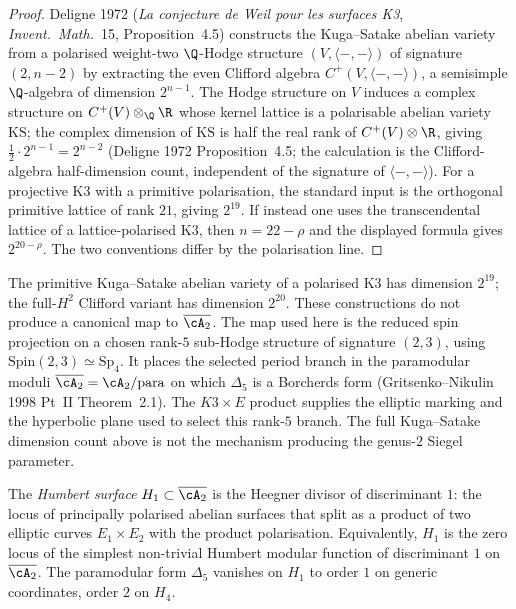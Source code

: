 \begin{proof}
Deligne 1972 (\emph{La conjecture de Weil pour les surfaces K3},
\emph{Invent.\ Math.}~15, Proposition~4.5) constructs the
Kuga--Satake abelian variety from a polarised weight-two
$\Q$-Hodge structure $(V, \langle -, - \rangle)$ of signature
$(2, n - 2)$ by extracting the even Clifford algebra
$C^+(V, \langle -, - \rangle)$, a semisimple $\Q$-algebra of
dimension $2^{n - 1}$. The Hodge structure on $V$ induces a
complex structure on $C^+(V) \otimes_\Q \R$ whose kernel lattice
is a polarisable abelian variety $\mathrm{KS}$; the complex
dimension of $\mathrm{KS}$ is half the real rank of $C^+(V) \otimes \R$,
giving $\tfrac12 \cdot 2^{n - 1} = 2^{n - 2}$ (Deligne 1972
Proposition~4.5; the calculation is the Clifford-algebra half-dimension
count, independent of the signature of $\langle -, - \rangle$).
For a projective K3 with a primitive polarisation, the standard input
is the orthogonal primitive lattice of rank $21$, giving
$2^{19}$. If instead one uses the transcendental lattice of a
lattice-polarised K3, then $n=22-\rho$ and the displayed formula gives
$2^{20-\rho}$. The two conventions differ by the polarisation line.
\end{proof}

\begin{remark}
\label{gluing:rem:ks-map-A2}
The primitive Kuga--Satake abelian variety of a polarised K3 has
dimension $2^{19}$; the full-$H^2$ Clifford variant has dimension
$2^{20}$. These constructions do not produce a canonical map to
\(\overline{\cA_2}\). The map used here is the reduced spin projection
on a chosen rank-\(5\) sub-Hodge structure of signature \((2,3)\),
using \(\mathrm{Spin}(2,3)\simeq\mathrm{Sp}_4\). It places the selected period branch in the paramodular
moduli $\overline{\cA_2} = \cA_2 / \mathrm{para}$ on which
$\Delta_5$ is a Borcherds form (Gritsenko--Nikulin 1998 Pt~II
Theorem~2.1). The \(K3\times E\) product supplies the elliptic marking
and the hyperbolic plane used to select this rank-\(5\) branch. The
full Kuga--Satake dimension count above is not the mechanism producing
the genus-\(2\) Siegel parameter.
\end{remark}

\begin{definition}
\label{gluing:def:humbert-H1}
The \emph{Humbert surface} $H_1 \subset \overline{\cA_2}$ is the
Heegner divisor of discriminant $1$: the locus of principally
polarised abelian surfaces that split as a product of two elliptic
curves $E_1 \times E_2$ with the product polarisation. Equivalently,
$H_1$ is the zero locus of the simplest non-trivial Humbert
modular function of discriminant $1$ on $\overline{\cA_2}$. The
paramodular form $\Delta_5$ vanishes on $H_1$ to order $1$ on
generic coordinates, order $2$ on $H_4$.
\end{definition}

